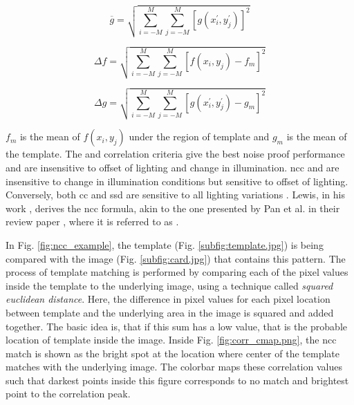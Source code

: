     \begin{equation}
        \overline{g} = \sqrt{\sum_{i=-M}^{M} \sum_{j=-M}^{M} [g(x_{i}^{'}, y_{j}^{'})]^2}
    \end{equation}

    \begin{equation}
        \Delta f = \sqrt{\sum_{i=-M}^{M} \sum_{j=-M}^{M} [f(x_{i}, y_{j}) - f_m]^2}
    \end{equation}

    \begin{equation}
        \Delta g = \sqrt{\sum_{i=-M}^{M} \sum_{j=-M}^{M} [g(x_{i}^{'}, y_{j}^{'}) - g_m]^2}
    \end{equation}
        
    \vspace{5mm}
    \noindent $f_m$ is the mean of $f(x_i, y_j)$ under the region of template and $g_m$ is the mean of the template. The  and  correlation criteria give the best noise proof performance and are insensitive to offset of lighting and change in illumination. \gls{ncc} and  are insensitive to change in illumination conditions but sensitive to offset of lighting. Conversely, both \gls{cc} and \gls{ssd} are sensitive to all lighting variations \cite{lewis, pan_review}. Lewis, in his work \cite{lewis}, derives the \gls{ncc} formula, akin to the one presented by Pan et al. in their review paper \cite{pan_review}, where it is referred to as .

    \vspace{5mm}
    \noindent In Fig. \ref{fig:ncc_example}, the template (Fig. \ref{subfig:template.jpg}) is being compared with the image (Fig. \ref{subfig:card.jpg}) that contains this pattern. The process of template matching is performed by comparing each of the pixel values inside the template to the underlying image, using a technique called \emph{squared euclidean distance}. Here, the difference in pixel values for each pixel location between template and the underlying area in the image is squared and added together. The basic idea is, that if this sum has a low value, that is the probable location of template inside the image. Inside Fig. \ref{fig:corr_cmap.png}, the \gls{ncc} match is shown as the bright spot at the location where center of the template matches with the underlying image. The colorbar maps these correlation values such that darkest points inside this figure corresponds to no match and brightest point to the correlation peak.

